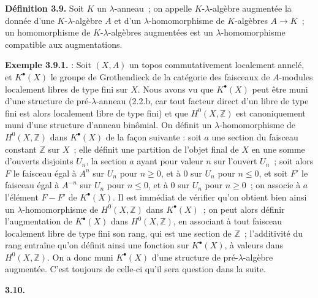 \textbf{Définition 3.9.} Soit \(K\) un \(\lambda\)-anneau~; on appelle \(K\)-\(\lambda\)-algèbre augmentée la donnée d'une \(K\)-\(\lambda\)-algèbre \(A\) et d'un \(\lambda\)-homomorphisme de \(K\)-algèbres \(A\to K\)~; un homomorphisme de \(K\)-\(\lambda\)-algèbres augmentées est un \(\lambda\)-homomorphisme compatible aux augmentations.

\textbf{Exemple 3.9.1.} : Soit \((X,A)\) un topos commutativement localement annelé, et \(K^\bullet(X)\) le groupe de Grothendieck de la catégorie des faisceaux de \(A\)-modules localement libres de type fini sur \(X\). Nous avons vu que \(K^\bullet(X)\) peut être muni d'une structure de pré-\(\lambda\)-anneau (2.2.b, car tout facteur direct d'un libre de type fini est alors localement libre de type fini) et que \(H^0(X,\mathbb Z)\) est canoniquement muni d'une structure d'anneau binômial. On définit un \(\lambda\)-homomorphisme de \(H^0(X,\mathbb Z)\) dans \(K^\bullet(X)\) de la façon suivante : soit \(a\) une section du faisceau constant \(\mathbb Z\) sur \(X\)~; elle définit une partition de l'objet final de \(X\) en une somme d'ouverts disjoints \(U_n\), la section \(a\) ayant pour valeur \(n\) sur l'ouvert \(U_n\)~; soit alors \(F\) le faisceau égal à \(A^n\) sur \(U_n\) pour \(n\ge0\), et à \(0\) sur \(U_n\) pour \(n\le0\), et soit \(F'\) le faisceau égal à \(A^{-n}\) sur \(U_n\) pour \(n\le0\), et à \(0\) sur \(U_n\) pour \(n\ge0\)~; on associe à \(a\) l'élément \(F-F'\) de \(K^\bullet(X)\). Il est immédiat de vérifier qu'on obtient bien ainsi un \(\lambda\)-homomorphisme de \(H^0(X,\mathbb Z)\) dans \(K^\bullet(X)\)~; on peut alors définir l'augmentation de \(K^\bullet(X)\) dans \(H^0(X,\mathbb Z)\), en associant à tout faisceau localement libre de type fini son rang, qui est une section de \(\mathbb Z\)~; l'additivité du rang entraîne qu'on définit ainsi une fonction sur \(K^\bullet(X)\), à valeurs dans \(H^0(X,\mathbb Z)\). On a donc muni \(K^\bullet(X)\) d'une structure de pré-\(\lambda\)-algèbre augmentée. C'est toujours de celle-ci qu'il sera question dans la suite.

\textbf{3.10.}
